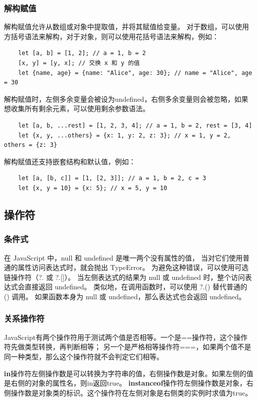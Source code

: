 \subsubsection{解构赋值}
解构赋值允许从数组或对象中提取值，并将其赋值给变量。
对于数组，可以使用方括号语法来解构，对于对象，则可以使用花括号语法来解构，例如：
\begin{verbatim}
    let [a, b] = [1, 2]; // a = 1, b = 2
    [x, y] = [y, x]; // 交换 x 和 y 的值
    let {name, age} = {name: "Alice", age: 30}; // name = "Alice", age = 30
\end{verbatim}
解构赋值时，左侧多余变量会被设为undefined，右侧多余变量则会被忽略，如果想收集所有剩余元素，可以使用剩余参数语法。
\begin{verbatim}
    let [a, b, ...rest] = [1, 2, 3, 4]; // a = 1, b = 2, rest = [3, 4]
    let {x, y, ...others} = {x: 1, y: 2, z: 3}; // x = 1, y = 2, others = {z: 3}
\end{verbatim}
解构赋值还支持嵌套结构和默认值，例如：
\begin{verbatim}
    let [a, [b, c]] = [1, [2, 3]]; // a = 1, b = 2, c = 3
    let {x, y = 10} = {x: 5}; // x = 5, y = 10
\end{verbatim}

\subsection{操作符}
\subsubsection{条件式}
在 JavaScript 中，null 和 undefined 是唯一两个没有属性的值，
当对它们使用普通的属性访问表达式时，就会抛出 TypeError。
为避免这种错误，可以使用可选链操作符（?. 或 ?.[]）。
当左侧表达式的结果为 null 或 undefined 时，整个访问表达式会直接返回 undefined。
类似地，在调用函数时，可以使用 ?.() 替代普通的 () 调用。
如果函数本身为 null 或 undefined，那么表达式也会返回 undefined。

\subsubsection{关系操作符}
JavaScript有两个操作符用于测试两个值是否相等。一个是==操作符，这个操作符先做类型转换，再判断相等；
另一个是严格相等操作符===，如果两个值不是同一种类型，那么这个操作符就不会判定它们相等。

\textbf{in}操作符左侧操作数是可以转换为字符串的值，右侧操作数是对象。如果左侧的值是右侧的对象的属性名，则in返回true。
\textbf{instanceof}操作符左侧操作数是对象，右侧操作数是对象类的标识。这个操作符在左侧对象是右侧类的实例时求值为true。

